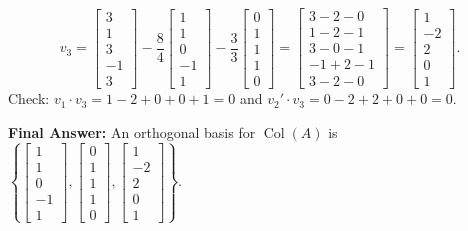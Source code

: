 \documentclass[11pt, letterpaper]{article}
\theoremstyle{definition}
\theoremstyle{remark}
\begin{document}
\begin{enumerate}[label=\textbf{Step \arabic*:}]
    \[
        v_3 = \begin{bmatrix} 3 \\ 1 \\ 3 \\ -1 \\ 3 \end{bmatrix} - \frac{8}{4}\begin{bmatrix} 1 \\ 1 \\ 0 \\ -1 \\ 1 \end{bmatrix} - \frac{3}{3}\begin{bmatrix} 0 \\ 1 \\ 1 \\ 1 \\ 0 \end{bmatrix}
        = \begin{bmatrix} 3 - 2 - 0 \\ 1 - 2 - 1 \\ 3 - 0 - 1 \\ -1 + 2 - 1 \\ 3 - 2 - 0 \end{bmatrix}
        = \begin{bmatrix} 1 \\ -2 \\ 2 \\ 0 \\ 1 \end{bmatrix}.
    \]
    Check: $v_1 \cdot v_3 = 1 - 2 + 0 + 0 + 1 = 0$ and $v_2' \cdot v_3 = 0 - 2 + 2 + 0 + 0 = 0$.
\end{enumerate}
\textbf{Final Answer:} An orthogonal basis for $\operatorname{Col}(A)$ is $\left\{ \begin{bmatrix} 1 \\ 1 \\ 0 \\ -1 \\ 1 \end{bmatrix}, \begin{bmatrix} 0 \\ 1 \\ 1 \\ 1 \\ 0 \end{bmatrix}, \begin{bmatrix} 1 \\ -2 \\ 2 \\ 0 \\ 1 \end{bmatrix} \right\}$.
\end{document}
